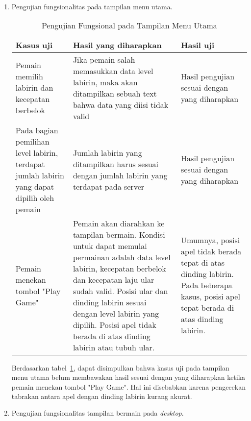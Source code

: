 \begin{enumerate}
	\item Pengujian fungsionalitas pada tampilan menu utama.
	
	\begin{table}[H]
		\caption{Pengujian Fungsional pada Tampilan Menu Utama} \label{tab:table1}
		\begin{tabular}{| m{4cm} | m{6cm}  | m{4cm} |}
			\hline
			Kasus uji & Hasil yang diharapkan & Hasil uji \\ \hline
			Pemain memilih labirin dan kecepatan berbelok & Jika pemain salah memasukkan data level labirin, maka akan ditampilkan sebuah text bahwa data yang diisi tidak valid & Hasil pengujian sesuai dengan yang diharapkan\\ \hline
			Pada bagian pemilihan level labirin, terdapat jumlah labirin yang dapat dipilih oleh pemain & Jumlah labirin yang ditampilkan harus sesuai dengan jumlah labirin yang terdapat pada server & Hasil pengujian sesuai dengan yang diharapkan\\ \hline
			Pemain menekan tombol "Play Game" & Pemain akan diarahkan ke tampilan bermain. Kondisi untuk dapat memulai permainan adalah data level labirin, kecepatan berbelok dan kecepatan laju ular sudah valid. Posisi ular dan dinding labirin sesuai dengan level labirin yang dipilih. Posisi apel tidak berada di atas dinding labirin atau tubuh ular. & Umumnya, posisi apel tidak berada tepat di atas dinding labirin. Pada beberapa kasus, posisi apel tepat berada di atas dinding labirin.\\ \hline
		\end{tabular}
	\end{table}
	
	Berdasarkan tabel~\ref{tab:table1}, dapat disimpulkan bahwa kasus uji pada tampilan menu utama belum membawakan hasil sesuai dengan yang diharapkan ketika pemain menekan tombol "Play Game". Hal ini disebabkan karena pengecekan tabrakan antara apel dengan dinding labirin kurang akurat. 
	
	\item Pengujian fungsionalitas tampilan bermain pada \textit{desktop}.
	

\end{enumerate}

